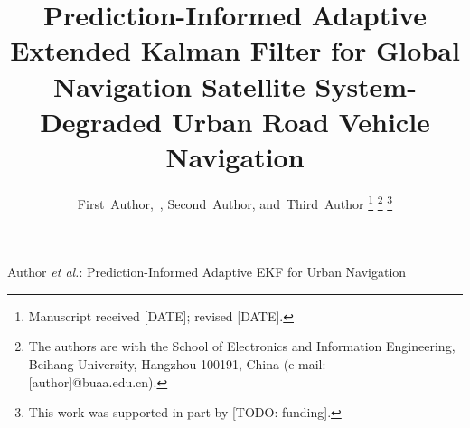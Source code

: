 \documentclass[journal]{IEEEtran}
\begin{document}
\title{Prediction-Informed Adaptive Extended Kalman Filter for Global
Navigation Satellite System-Degraded Urban Road Vehicle Navigation}

\author{First~Author,~,
        Second~Author,
        and~Third~Author%
\thanks{Manuscript received [DATE]; revised [DATE].}%
\thanks{The authors are with the School of Electronics and Information
Engineering, Beihang University, Hangzhou 100191, China
(e-mail: [author]@buaa.edu.cn).}%
\thanks{This work was supported in part by [TODO: funding].}}

%
{Author \MakeLowercase{\textit{et al.}}: Prediction-Informed Adaptive EKF
for Urban Navigation}


\maketitle
\end{document}
